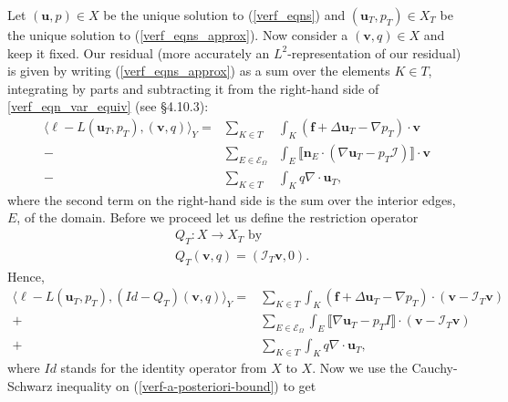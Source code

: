 \documentclass[12pt,a4paper]{article}
\theoremstyle{definition}
\begin{document}
Let $\left(\textbf{u},p\right)\in X$ be the unique solution to (\ref{verf_eqns}) and $\left(\textbf{u}_T,p_T\right)\in X_T$ be the unique solution to (\ref{verf_eqns_approx}).  Now consider a $\left(\textbf{v},q\right)\in X$ and keep it fixed.  Our residual (more accurately an $L^2$-representation of our residual) is given by writing (\ref{verf_eqns_approx}) as a sum over the elements $K\in T$, integrating by parts and subtracting it from the right-hand side of \ref{verf_eqn_var_equiv} (see \cite{verfurth2013posteriori} \S 4.10.3):
\begin{eqnarray}\label{L2-rep-residual}
\langle \ell -L\left(\textbf{u}_T,p_T\right),\left(\textbf{v},q\right) \rangle_Y= &\sum_{K\in T}&\int_{K}\left(\textbf{f}+\Delta \textbf{u}_T-\nabla p_T\right)\cdot \textbf{v}\nonumber\\-&\sum_{E\in \mathcal{E}_{\Omega}}&\int_{E}\llbracket\textbf{n}_E\cdot\left(\nabla \textbf{u}_T-p_T\mathcal{I}\right)\rrbracket \cdot \textbf{v}\\
-&\sum_{K\in T}&\int_{K}q \nabla \cdot \textbf{u}_T, \nonumber
\end{eqnarray}
where the second term on the right-hand side is the sum over the interior edges, $E$, of the domain.   Before we proceed let us define the restriction operator 
\begin{equation}\label{restrict_operator}
\begin{aligned}
&Q_T:X\rightarrow X_T\text{ by}\\
&Q_T\left(\textbf{v},q\right)=\left(\mathcal{I}_T\textbf{v},0\right).
\end{aligned}
\end{equation}
Hence,
\begin{equation}\label{verf-a-posteriori-bound}
\begin{aligned}
\langle \ell -L\left(\textbf{u}_T,p_T\right),\left(Id-Q_T\right)\left(\textbf{v},q\right) \rangle_Y= &\sum_{K\in T}\int_{K}\left(\textbf{f}+\Delta \textbf{u}_T-\nabla p_T\right)\cdot \left(\textbf{v}-\mathcal{I}_T\textbf{v}\right)\\+&\sum_{E\in \mathcal{E}_{\Omega}}\int_{E}\llbracket\nabla \textbf{u}_T-p_TI\rrbracket \cdot \left(\textbf{v}-\mathcal{I}_T\textbf{v}\right)\\
+&\sum_{K\in T}\int_{K}q \nabla \cdot \textbf{u}_T, 
\end{aligned}
\end{equation}
where $Id$ stands for the identity operator from $X$ to $X$.  Now we use the Cauchy-Schwarz inequality on (\ref{verf-a-posteriori-bound}) to get
\end{document}
